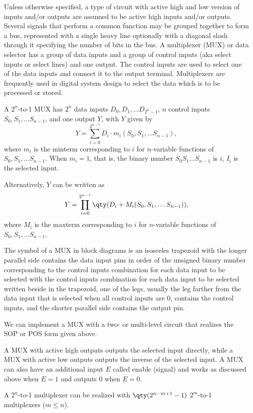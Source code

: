 \documentclass[a4paper,12pt]{article}
\begin{document}
\begin{itemize}
\begin{itemize}
\begin{itemize}
\begin{itemize}
\begin{itemize}
\begin{itemize}
\begin{itemize}
Unless otherwise specified, a type of circuit with active high and low version of inputs and/or outputs are assumed to be active high inputs and/or outputs.
Several signals that perform a common function may be grouped together to form a bus, represented with a single heavy line optionally with a diagonal slash through it specifying the number of bits in the bus.
A multiplexer (MUX) or data selector has a group of data inputs and a group of control inputs (aka select inputs or select lines) and one output. The control inputs are used to select one of the data inputs and connect it to the output terminal. Multiplexers are frequently used in digital system design to select the data which is to be processed or stored.

A $2^n$-to-1 MUX has $2^n$ data inputs $D_0,D_1,\ldots D_{2^n-1}$, $n$ control inputs $S_0,S_1,\ldots S_{n-1}$, and one output $Y$, with $Y$ given by
\[Y=\sum_{i=0}^{2^{n-1}}D_i\cdot m_i(S_0,S_1,\ldots S_{n-1}),\]
where $m_i$ is the minterm corresponding to $i$ for $n$-variable functions of $S_0,S_1,\ldots S_{n-1}$. When $m_i=1$, that is, the binary number $S_0S_1\ldots S_{n-1}$ is $i$, $I_i$ is the selected input.

Alternatively, $Y$ can be written as
\[Y=\prod_{i=0}^{2^{n-1}}\qty(D_i+M_i(S_0,S_1,\ldots S_{n-1})),\]
where $M_i$ is the maxterm corresponding to $i$ for $n$-variable functions of $S_0,S_1,\ldots S_{n-1}$.

The symbol of a MUX in block diagrams is an isosceles trapezoid with the longer parallel side contains the data input pins in order of the unsigned binary number corresponding to the control inputs combination for each data input to be selected with the control inputs combination for each data input to be selected written beside in the trapezoid, one of the legs, usually the leg farther from the data input that is selected when all control inputs are 0, contains the control inputs, and the shorter parallel side contains the output pin.

We can implement a MUX with a two- or multi-level circuit that realizes the SOP or POS form given above.

A MUX with active high outputs outputs the selected input directly, while a MUX with active low outputs outputs the inverse of the selected input. A MUX can also have an additional input $E$ called enable (signal) and works as discussed above when $E=1$ and outputs $0$ when $E=0$.

A $2^n$-to-1 multiplexer can be realized with $\qty(2^{n-m+1}-1)$ $2^m$-to-1 multiplexers ($m\leq n$).


\end{itemize}
\end{itemize}
\end{itemize}
\end{itemize}
\end{itemize}
\end{itemize}
\end{itemize}
\end{document}
